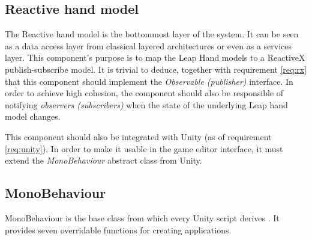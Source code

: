 \documentclass[12pt,a4paper,twoside]{report}
\begin{document}
\subsection{Reactive hand model}
The Reactive hand model is the bottommost layer of the system. It can be seen as a data access layer from classical layered architectures or even as a services layer. This component's purpose is to map the Leap Hand models to a ReactiveX publish-subscribe model. It is trivial to deduce, together with requirement \ref{req:rx} that this component should implement the \textit{Observable (publisher)} interface. In order to achieve high cohesion, the component should also be responsible of notifying \textit{observers (subscribers)} when the state of the underlying Leap hand model changes.

This component should also be integrated with Unity (as of requirement \ref{req:unity}). In order to make it usable in the game editor interface, it must extend the \textit{MonoBehaviour} abstract class from Unity.

\subsection{MonoBehaviour}
MonoBehaviour is the base class from which every Unity script derives \cite{MonoBeh}. It provides seven overridable functions for creating applications.
\end{document}
